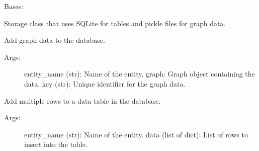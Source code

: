 \documentclass[letterpaper,10pt,english]{sphinxmanual}
\begin{document}

\begin{fulllineitems}
\label{\detokenize{eda_schema:eda_schema.db.SQLitePickleDB}}
\pysigstartsignatures
{}
\pysigstopsignatures
\sphinxAtStartPar
Bases: {\hyperref[\detokenize{eda_schema:eda_schema.db.BaseDB}]{}}

\sphinxAtStartPar
Storage class that uses SQLite for tables and pickle files for graph data.

\begin{fulllineitems}
\label{\detokenize{eda_schema:eda_schema.db.SQLitePickleDB.add_graph_data}}
\pysigstartsignatures
{}
\pysigstopsignatures
\sphinxAtStartPar
Add graph data to the database.
\begin{description}
\item[{Args:}] \leavevmode
\sphinxAtStartPar
entity\_name (str): Name of the entity.
graph: Graph object containing the data.
key (str): Unique identifier for the graph data.

\end{description}

\end{fulllineitems}


\begin{fulllineitems}
\label{\detokenize{eda_schema:eda_schema.db.SQLitePickleDB.add_table_data}}
\pysigstartsignatures
{}
\pysigstopsignatures
\sphinxAtStartPar
Add multiple rows to a data table in the database.
\begin{description}
\item[{Args:}] \leavevmode
\sphinxAtStartPar
entity\_name (str): Name of the entity.
data (list of dict): List of rows to insert into the table.


\end{description}
\end{fulllineitems}
\end{fulllineitems}
\end{document}
